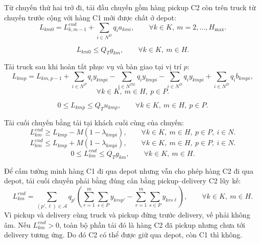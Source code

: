 \documentclass[12pt,a4paper]{article}
\begin{document}
Từ chuyến thứ hai trở đi, tải đầu chuyến gồm hàng pickup C2 còn trên truck từ chuyến
trước cộng với hàng C1 mới được chất ở depot:
\begin{equation}
  L_{km0}=L^{end}_{k,m-1}+\sum_{i\in N^D}q_i a_{kmi},
  \qquad \forall k\in K,\ m=2,\ldots,H_{\max}.
\end{equation}

\begin{equation}
  L_{km0}\le Q_Tg_{km},
  \qquad \forall k\in K,\ m\in H.
\end{equation}

Tải truck sau khi hoàn tất phục vụ và bàn giao tại vị trí \(p\):
\begin{equation}
  L_{kmp}
  =
  L_{km,p-1}
  +\sum_{i\in N^P}q_i y_{kmpi}
  -\sum_{i\in N^{DL}}q_i y_{kmpi}
  -\sum_{i\in N^D}q_i y_{kmpi}
  +\sum_{i\in N^D}q_i b_{kmpi},
\end{equation}
\[
  \forall k\in K,\ m\in H,\ p\in P.
\]

\begin{equation}
  0\le L_{kmp}\le Q_Tu_{kmp},
  \qquad \forall k\in K,\ m\in H,\ p\in P.
\end{equation}

Tải cuối chuyến bằng tải tại khách cuối cùng của chuyến:
\begin{equation}
  L^{end}_{km}\ge L_{kmp}-M(1-\lambda_{kmpi}),
  \qquad \forall k\in K,\ m\in H,\ p\in P,\ i\in N.
\end{equation}
\begin{equation}
  L^{end}_{km}\le L_{kmp}+M(1-\lambda_{kmpi}),
  \qquad \forall k\in K,\ m\in H,\ p\in P,\ i\in N.
\end{equation}
\begin{equation}
  0\le L^{end}_{km}\le Q_Tg_{km},
  \qquad \forall k\in K,\ m\in H.
\end{equation}

Để cấm tường minh hàng C1 đi qua depot nhưng vẫn cho phép hàng C2 đi qua depot, tải
cuối chuyến phải bằng đúng cân bằng pickup--delivery C2 lũy kế:
\begin{equation}
  L^{end}_{km}
  =
  \sum_{(p',\ell)\in\mathcal A}q_{p'}
  \left(
    \sum_{r=1}^{m}\sum_{s\in P}y_{krs p'}
    -
    \sum_{r=1}^{m}\sum_{s\in P}y_{krs\ell}
  \right),
  \qquad \forall k\in K,\ m\in H.
\end{equation}
Vì pickup và delivery cùng truck và pickup đứng trước delivery, vế phải không âm.
Nếu \(L^{end}_{km}>0\), toàn bộ phần tải đó là hàng C2 đã pickup nhưng chưa tới
delivery tương ứng. Do đó C2 có thể được giữ qua depot, còn C1 thì không.
\end{document}
